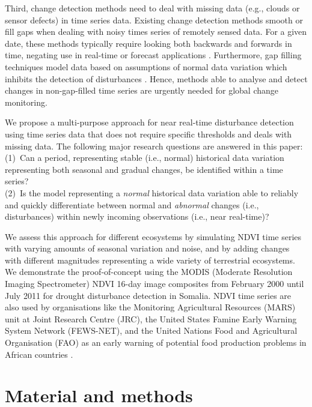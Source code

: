\documentclass[authoryear,preprint,review,10pt]{elsarticle}
\begin{document}
Third, change detection methods need to deal with missing data (e.g., clouds or sensor defects) in time series data.
Existing change detection methods smooth or fill gaps \citep{Jonsson2002, Roerink2000, Julien2010} when dealing with noisy times series of remotely sensed data. For a given date, these methods typically require looking both backwards and forwards in time, negating use in real-time or forecast applications \citep{White2006}.  Furthermore, gap filling techniques model data based on assumptions of normal data variation which inhibits the detection of disturbances \citep{Samanta:2011hp}. Hence, methods able to analyse and detect changes in non-gap-filled time series are urgently needed for global change monitoring.

We propose a multi-purpose approach for near real-time disturbance detection using time series data that does not require specific thresholds and deals with missing data. The following major research questions are answered in this paper: \\
(1)~Can a period, representing stable (i.e., normal) historical data variation representing both seasonal and gradual changes, be identified within a time series?\\
(2)~Is the model representing a \emph{normal} historical data variation able to reliably and quickly differentiate between normal and \emph{abnormal} changes (i.e., disturbances) within newly incoming observations (i.e., near real-time)?

We assess this approach for different ecosystems by simulating NDVI time series with varying amounts of seasonal variation and noise, and by adding changes with different magnitudes representing a wide variety of terrestrial ecosystems.  We demonstrate the proof-of-concept using the MODIS (Moderate Resolution Imaging Spectrometer) NDVI 16-day image composites from February 2000 until July 2011 for drought disturbance detection in Somalia. NDVI time series are also used by organisations like the Monitoring Agricultural Resources (MARS) unit at Joint Research Centre (JRC), the United States Famine Early Warning System Network (FEWS-NET), and the United Nations Food and Agricultural Organisation (FAO) as an early warning of potential food production problems in African countries \citep{Rojas:2005bz}.
 
\section{Material and methods}
\end{document}
